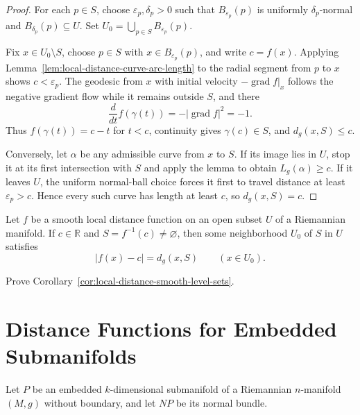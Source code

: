 \begin{proof}
\sketch For each $p\in S$, choose $\varepsilon_p,\delta_p>0$ such that
$B_{\varepsilon_p}(p)$ is uniformly $\delta_p$-normal and
$B_{\delta_p}(p)\subseteq U$. Set
$U_0=\bigcup_{p\in S}B_{\varepsilon_p}(p)$.

Fix $x\in U_0\setminus S$, choose $p\in S$ with
$x\in B_{\varepsilon_p}(p)$, and write $c=f(x)$. Applying
Lemma~\ref{lem:local-distance-curve-arc-length} to the radial segment from
$p$ to $x$ shows $c<\varepsilon_p$. The geodesic from $x$ with initial
velocity $-\operatorname{grad}f|_x$ follows the negative gradient flow while
it remains outside $S$, and there
\[
\frac d{dt}f(\gamma(t))=-|\operatorname{grad}f|^2=-1.
\]
Thus $f(\gamma(t))=c-t$ for $t<c$, continuity gives
$\gamma(c)\in S$, and $d_g(x,S)\leq c$.

Conversely, let $\alpha$ be any admissible curve from $x$ to $S$. If its
image lies in $U$, stop it at its first intersection with $S$ and apply the
lemma to obtain $L_g(\alpha)\geq c$. If it leaves $U$, the uniform normal-ball
choice forces it first to travel distance at least $\varepsilon_p>c$. Hence
every such curve has length at least $c$, so $d_g(x,S)=c$.
\end{proof}

\begin{corollary}
\label{cor:local-distance-smooth-level-sets}

Let $f$ be a smooth local distance function on an open subset $U$ of a
Riemannian manifold. If $c\in\mathbb R$ and
$S=f^{-1}(c)\neq\varnothing$, then some neighborhood $U_0$ of $S$ in $U$
satisfies
\[
|f(x)-c|=d_g(x,S)
\qquad(x\in U_0).
\]
\end{corollary}

\begin{exercise}
\label{exer:prove-local-distance-corollary}

Prove Corollary~\ref{cor:local-distance-smooth-level-sets}.
\end{exercise}

\section{Distance Functions for Embedded Submanifolds}

Let $P$ be an embedded $k$-dimensional submanifold of a Riemannian
$n$-manifold $(M,g)$ without boundary, and let $NP$ be its normal bundle.

